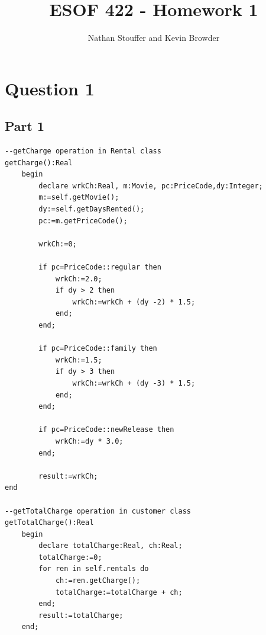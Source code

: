 \documentclass{article}
\begin{document}
	
\title{ESOF 422 - Homework 1}
\author{Nathan Stouffer and Kevin Browder}

\maketitle
\newpage

\section*{Question 1}
\subsection*{Part 1}
\begin{Verbatim}
--getCharge operation in Rental class
getCharge():Real
	begin
		declare wrkCh:Real, m:Movie, pc:PriceCode,dy:Integer;
		m:=self.getMovie();
		dy:=self.getDaysRented();
		pc:=m.getPriceCode();

		wrkCh:=0;

		if pc=PriceCode::regular then
			wrkCh:=2.0;
			if dy > 2 then
				wrkCh:=wrkCh + (dy -2) * 1.5;
			end;
		end;

		if pc=PriceCode::family then
			wrkCh:=1.5;
			if dy > 3 then
				wrkCh:=wrkCh + (dy -3) * 1.5;
			end;
		end;

		if pc=PriceCode::newRelease then
			wrkCh:=dy * 3.0;
		end;

		result:=wrkCh;
end

--getTotalCharge operation in customer class
getTotalCharge():Real
	begin
		declare totalCharge:Real, ch:Real;
		totalCharge:=0;
		for ren in self.rentals do
			ch:=ren.getCharge();
			totalCharge:=totalCharge + ch;
		end;
		result:=totalCharge;
	end;
\end{Verbatim}
\end{document}
